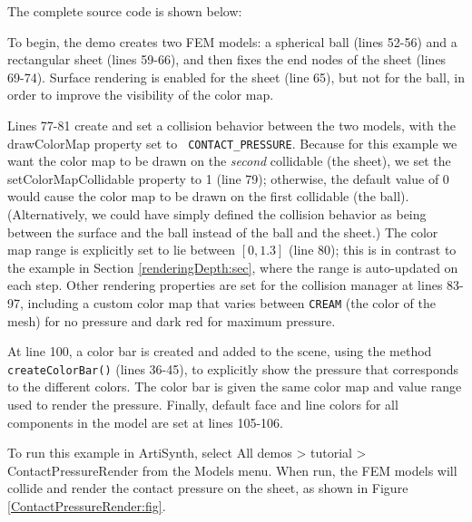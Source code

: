 The complete source code is shown below:
%
\lstset{numbers=left}

\lstset{numbers=none} 

To begin, the demo creates two FEM models: a spherical ball (lines
52-56) and a rectangular sheet (lines 59-66), and then fixes the end
nodes of the sheet (lines 69-74). Surface rendering is enabled for
the sheet (line 65), but not for the ball, in order to improve the
visibility of the color map.

Lines 77-81 create and set a collision behavior between the two
models, with the {\sf drawColorMap} property set to {\tt
CONTACT\_PRESSURE}. Because for this example we want the color map to
be drawn on the {\it second} collidable (the sheet), we set the {\sf
setColorMapCollidable} property to 1 (line 79); otherwise, the default
value of 0 would cause the color map to be drawn on the first
collidable (the ball). (Alternatively, we could have simply defined the
collision behavior as being between the surface and the ball instead of
the ball and the sheet.) The color map range is explicitly set to lie
between $[0, 1.3]$ (line 80); this is in contrast to the example in
Section \ref{renderingDepth:sec}, where the range is auto-updated on
each step.  Other rendering properties are set for the collision
manager at lines 83-97, including a custom color map that varies
between {\tt CREAM} (the color of the mesh) for no pressure and dark
red for maximum pressure.

At line 100, a color bar is created and added to the scene, using the
method {\tt createColorBar()} (lines 36-45), to explicitly show the
pressure that corresponds to the different colors. The color bar is
given the same color map and value range used to render the
pressure. Finally, default face and line colors for all components in
the model are set at lines 105-106.

To run this example in ArtiSynth, select {\sf All demos > tutorial >
ContactPressureRender} from the {\sf Models} menu. When run, the FEM
models will collide and render the contact pressure on the sheet, as
shown in Figure \ref{ContactPressureRender:fig}.
